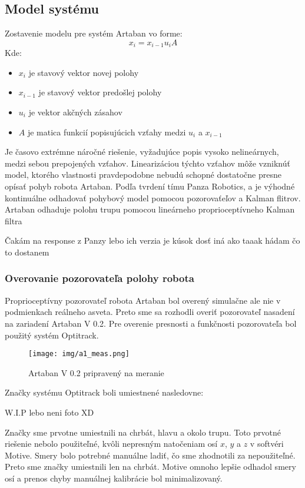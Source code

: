 \subsection{Model systému}
Zostavenie modelu pre systém Artaban vo forme:
\begin{equation}
    x_{i}=x_{i-1}u_iA
\end{equation}
Kde:
\begin{itemize}
    \item $x_i$ je stavový vektor novej polohy
    \item $x_{i-1}$ je stavový vektor predošlej polohy
    \item $u_i$ je vektor akčných zásahov
    \item $A$ je matica funkcií popisujúcich vzťahy medzi $u_i$ a $x_{i-1}$ 
\end{itemize}
Je časovo extrémne náročné riešenie, vyžadujúce popis vysoko nelineárnych, medzi sebou prepojených vzťahov. Linearizáciou týchto vzťahov môže vzniknúť model, ktorého vlastnosti pravdepodobne nebudú schopné dostatočne presne opísať pohyb robota Artaban.\newline
Podľa tvrdení tímu Panza Robotics, \cite{est} a \cite{propEst} je výhodné kontinuálne odhadovať pohybový model pomocou pozorovaťeľov a Kalman flitrov. Artaban odhaduje polohu trupu pomocou lineárneho proprioceptívneho Kalman filtra
\begin{center}
    Čakám na response z Panzy lebo ich verzia je kúsok dosť iná ako \cite{propEst} taaak hádam čo to dostanem
\end{center}

\newpage\subsubsection{Overovanie pozorovateľa polohy robota}
Proprioceptívny pozorovateľ robota Artaban bol overený simulačne ale nie v podmienkach reálneho asveta. Preto sme sa rozhodli overiť pozorovateľ nasadení na zariadení Artaban V 0.2. Pre overenie presnosti a funkčnosti pozorovateľa bol použitý systém Optitrack.
\begin{figure}[!htbp]
    \centering
    \texttt{[image: img/a1\_meas.png]}
    \caption{Artaban V 0.2 pripravený na meranie}
    \label{artMeas}
\end{figure}	

\noindent Značky systému Optitrack boli umiestnené nasledovne:
\begin{center}
    W.I.P lebo neni foto XD
\end{center}
Značky sme prvotne umiestnili na chrbát, hlavu a okolo trupu. Toto prvotné riešenie nebolo použiteľné, kvôli nepresným natočeniam osí $x$, $y$ a $z$ v softvéri Motive. Smery bolo potrebné manuálne ladiť, čo sme zhodnotili za nepoužiteľné.\newline
Preto sme značky umiestnili len na chrbát. Motive omnoho lepšie odhadol smery osí a prenos chyby manuálnej kalibrácie bol minimalizovaný.

